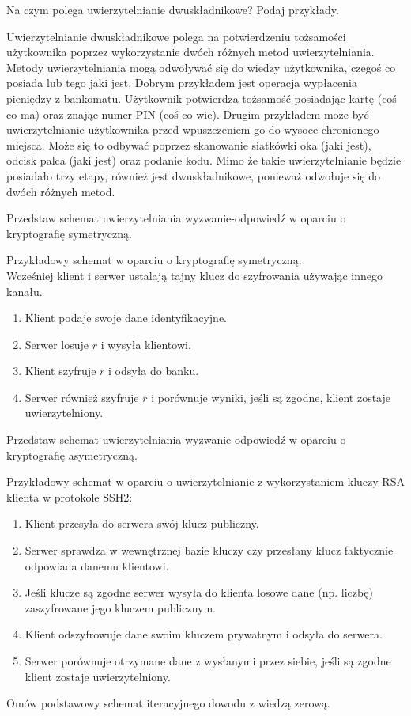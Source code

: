 \documentclass[answers,11pt]{exam}
\begin{document}
\begin{questions}
\question Na czym polega uwierzytelnianie dwuskładnikowe? Podaj przykłady.
\begin{solution}
Uwierzytelnianie dwuskładnikowe polega na potwierdzeniu tożsamości użytkownika poprzez wykorzystanie dwóch różnych metod uwierzytelniania. Metody uwierzytelniania mogą odwoływać się do wiedzy użytkownika, czegoś co posiada lub tego jaki jest. Dobrym przykładem jest operacja wypłacenia pieniędzy z bankomatu. Użytkownik potwierdza tożsamość posiadając kartę (coś co ma) oraz znając numer PIN (coś co wie). Drugim przykładem może być uwierzytelnianie użytkownika przed wpuszczeniem go do wysoce chronionego miejsca. Może się to odbywać poprzez skanowanie siatkówki oka (jaki jest), odcisk palca (jaki jest) oraz podanie kodu. Mimo że takie uwierzytelnianie będzie posiadało trzy etapy, również jest dwuskładnikowe, ponieważ odwołuje się do dwóch różnych metod.
\end{solution}

\question Przedstaw schemat uwierzytelniania wyzwanie-odpowiedź w oparciu o kryptografię symetryczną.
\begin{solution}
Przykładowy schemat w oparciu o kryptografię symetryczną:\\
Wcześniej klient i serwer ustalają tajny klucz do szyfrowania używając innego kanału.
\begin{enumerate}
\item Klient podaje swoje dane identyfikacyjne.
\item Serwer losuje $r$ i wysyła klientowi.
\item Klient szyfruje $r$ i odsyła do banku.
\item Serwer również szyfruje $r$ i porównuje wyniki, jeśli są zgodne, klient zostaje uwierzytelniony.
\end{enumerate}
\end{solution}

\question Przedstaw schemat uwierzytelniania wyzwanie-odpowiedź w oparciu o kryptografię asymetryczną.

\begin{solution}
Przykładowy schemat w oparciu o uwierzytelnianie z wykorzystaniem kluczy RSA klienta w protokole SSH2:
\begin{enumerate}
\item Klient przesyła do serwera swój klucz publiczny.
\item Serwer sprawdza w wewnętrznej bazie kluczy czy przesłany klucz faktycznie odpowiada danemu klientowi.
\item Jeśli klucze są zgodne serwer wysyła do klienta losowe dane (np. liczbę) zaszyfrowane jego kluczem publicznym.
\item Klient odszyfrowuje dane swoim kluczem prywatnym i odsyła do serwera.
\item Serwer porównuje otrzymane dane z wysłanymi przez siebie, jeśli są zgodne klient zostaje uwierzytelniony.
\end{enumerate}
\end{solution}

\question Omów podstawowy schemat iteracyjnego dowodu z wiedzą zerową.

\end{questions}
\end{document}
